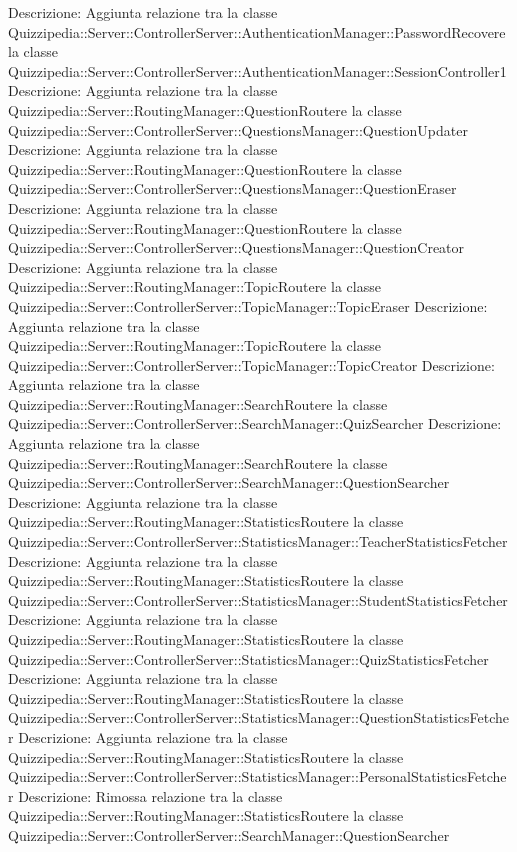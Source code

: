 Descrizione: Aggiunta relazione tra la classe Quizzipedia::Server::ControllerServer::AuthenticationManager::PasswordRecovere la classe Quizzipedia::Server::ControllerServer::AuthenticationManager::SessionController1 
Descrizione: Aggiunta relazione tra la classe Quizzipedia::Server::RoutingManager::QuestionRoutere la classe Quizzipedia::Server::ControllerServer::QuestionsManager::QuestionUpdater 
Descrizione: Aggiunta relazione tra la classe Quizzipedia::Server::RoutingManager::QuestionRoutere la classe Quizzipedia::Server::ControllerServer::QuestionsManager::QuestionEraser 
Descrizione: Aggiunta relazione tra la classe Quizzipedia::Server::RoutingManager::QuestionRoutere la classe Quizzipedia::Server::ControllerServer::QuestionsManager::QuestionCreator 
Descrizione: Aggiunta relazione tra la classe Quizzipedia::Server::RoutingManager::TopicRoutere la classe Quizzipedia::Server::ControllerServer::TopicManager::TopicEraser 
Descrizione: Aggiunta relazione tra la classe Quizzipedia::Server::RoutingManager::TopicRoutere la classe Quizzipedia::Server::ControllerServer::TopicManager::TopicCreator 
Descrizione: Aggiunta relazione tra la classe Quizzipedia::Server::RoutingManager::SearchRoutere la classe Quizzipedia::Server::ControllerServer::SearchManager::QuizSearcher 
Descrizione: Aggiunta relazione tra la classe Quizzipedia::Server::RoutingManager::SearchRoutere la classe Quizzipedia::Server::ControllerServer::SearchManager::QuestionSearcher 
Descrizione: Aggiunta relazione tra la classe Quizzipedia::Server::RoutingManager::StatisticsRoutere la classe Quizzipedia::Server::ControllerServer::StatisticsManager::TeacherStatisticsFetcher 
Descrizione: Aggiunta relazione tra la classe Quizzipedia::Server::RoutingManager::StatisticsRoutere la classe Quizzipedia::Server::ControllerServer::StatisticsManager::StudentStatisticsFetcher 
Descrizione: Aggiunta relazione tra la classe Quizzipedia::Server::RoutingManager::StatisticsRoutere la classe Quizzipedia::Server::ControllerServer::StatisticsManager::QuizStatisticsFetcher 
Descrizione: Aggiunta relazione tra la classe Quizzipedia::Server::RoutingManager::StatisticsRoutere la classe Quizzipedia::Server::ControllerServer::StatisticsManager::QuestionStatisticsFetcher 
Descrizione: Aggiunta relazione tra la classe Quizzipedia::Server::RoutingManager::StatisticsRoutere la classe Quizzipedia::Server::ControllerServer::StatisticsManager::PersonalStatisticsFetcher 
Descrizione: Rimossa relazione tra la classe Quizzipedia::Server::RoutingManager::StatisticsRoutere la classe Quizzipedia::Server::ControllerServer::SearchManager::QuestionSearcher 
